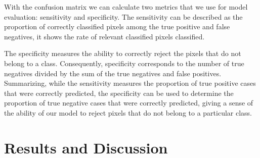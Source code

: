 \documentclass[12pt,a4paper]{scrartcl}
\begin{document}
With the confusion matrix we can calculate two metrics that we use for model evaluation: sensitivity and specificity. 
The sensitivity can be described as the proportion of correctly classified pixels among the true positive and false negatives, it shows the rate of relevant classified pixels classified. 

The specificity measures the ability to correctly reject the pixels that do not belong to a class. Consequently, specificity corresponds to the number of true negatives divided by the sum of the true negatives and false positives. Summarizing, while the sensitivity measures the proportion of true positive cases that were correctly predicted, the specificity can be used to determine the proportion of true negative cases that were correctly predicted, giving a sense of the ability of our model to reject pixels that do not belong to a particular class. 


 \section{Results and Discussion}
\end{document}

